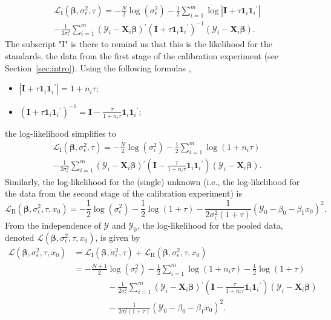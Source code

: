 \documentclass[cmfont,usenames,dvipsnames,leqno]{afit-etd}\usepackage[]{graphicx}\usepackage[]{color}
\newcommand{\newln}{\\&\quad\quad\quad\quad{}}
\newcommand{\loglik}{\mathscr{L}}
\newcommand{\trans}{\ensuremath{^\prime}}
\newcommand{\bc}[1]{\ensuremath{\bm{\mathcal{#1}}}}
\newcommand{\mc}[1]{\ensuremath{\mathcal{#1}}}
\newcommand{\X}{\ensuremath{\bm{X}}}
\begin{document}
\begin{multline*}
  \loglik_{\mathrm{I}}\left(\bm{\beta}, \sigma_\epsilon^2, \tau\right) = -\frac{N}{2}\log\left(\sigma_\epsilon^2\right) - \frac{1}{2}\sum_{i = 1}^m \log\left|\bm{I} + \tau\bm{1}_i\bm{1}_i\trans\right| \\ - \frac{1}{2\sigma_\epsilon^2}\sum_{i = 1}^m \left(\bc{Y}_i - \X_i\bm{\beta}\right)\trans\left(\bm{I} + \tau\bm{1}_i\bm{1}_i\trans\right)^{-1}\left(\bc{Y}_i - \X_i\bm{\beta}\right).
\end{multline*}
The subscript "$\mathrm{I}$" is there to remind us that this is the likelihood for the standards, the data from the first stage of the calibration experiment (see Section~\ref{sec:intro}). Using the following formulas \citep[pg. 49]{demidenko_mixed_2013},
\begin{itemize}
  \item $\left|\bm{I} + \tau\bm{1}_i\bm{1}_i\trans\right| = 1 + n_i\tau$;
  \item $\left(\bm{I} + \tau\bm{1}_i\bm{1}_i\trans\right)^{-1} = \bm{I} - \frac{\tau}{1 + n_i\tau}\bm{1}_i\bm{1}_i\trans$;
\end{itemize}
the log-likelihood simplifies to
\begin{multline*}
  \loglik_{\mathrm{I}}\left(\bm{\beta}, \sigma_\epsilon^2, \tau\right) = -\frac{N}{2}\log\left(\sigma_\epsilon^2\right) - \frac{1}{2}\sum_{i = 1}^m \log\left(1 + n_i\tau\right) \\ - \frac{1}{2\sigma_\epsilon^2}\sum_{i = 1}^m \left(\bc{Y}_i - \X_i\bm{\beta}\right)\trans\left(\bm{I} - \frac{\tau}{1 + n_i\tau}\bm{1}_i\bm{1}_i\trans\right)\left(\bc{Y}_i - \X_i\bm{\beta}\right).
\end{multline*}
Similarly, the log-likelihood for the (single) unknown (i.e., the log-likelihood for the data from the second stage of the calibration experiment) is 
\begin{equation*}
  \loglik_{\mathrm{II}}\left(\bm{\beta}, \sigma_\epsilon^2, \tau, x_0\right) = -\frac{1}{2}\log\left(\sigma_\epsilon^2\right) - \frac{1}{2}\log\left(1 + \tau\right) - \frac{1}{2\sigma_\epsilon^2\left(1 + \tau\right)}\left(\mc{Y}_0 - \beta_0 - \beta_1 x_0\right)^2.
\end{equation*}
From the independence of $\bc{Y}$ and $\mc{Y}_0$, the log-likelihood for the pooled data, denoted $\loglik\left(\bm{\beta}, \sigma_\epsilon^2, \tau, x_0\right)$, is given by
\begin{align*}
  \loglik\left(\bm{\beta}, \sigma_\epsilon^2, \tau, x_0\right) &= \loglik_{\mathrm{I}}\left(\bm{\beta}, \sigma_\epsilon^2, \tau\right) + \loglik_{\mathrm{II}}\left(\bm{\beta}, \sigma_\epsilon^2, \tau, x_0\right) \\
  &= -\frac{N+1}{2}\log\left(\sigma_\epsilon^2\right) - \frac{1}{2}\sum_{i = 1}^m \log\left(1 + n_i\tau\right) - \frac{1}{2}\log\left(1 + \tau\right) \newln - \frac{1}{2\sigma_\epsilon^2}\sum_{i = 1}^m \left(\bc{Y}_i - \X_i\bm{\beta}\right)\trans\left(\bm{I} - \frac{\tau}{1 + n_i\tau}\bm{1}_i\bm{1}_i\trans\right)\left(\bc{Y}_i - \X_i\bm{\beta}\right) \newln - \frac{1}{2\sigma_\epsilon^2\left(1 + \tau\right)}\left(\mc{Y}_0 - \beta_0 - \beta_1 x_0\right)^2.
\end{align*}
\end{document}
